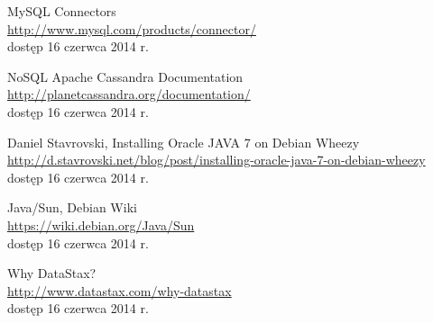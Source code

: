 \documentclass{article}
\begin{document}
\begin{thebibliography}{Xxx99x}

MySQL Connectors\\
\url{http://www.mysql.com/products/connector/}\\
dostęp 16 czerwca 2014 r.

NoSQL Apache Cassandra Documentation\\
\url{http://planetcassandra.org/documentation/}\\
dostęp 16 czerwca 2014 r.

Daniel Stavrovski, Installing Oracle JAVA 7 on Debian Wheezy\\
\url{http://d.stavrovski.net/blog/post/installing-oracle-java-7-on-debian-wheezy}\\
dostęp 16 czerwca 2014 r.

Java/Sun, Debian Wiki\\
\url{https://wiki.debian.org/Java/Sun}\\
dostęp 16 czerwca 2014 r.

Why DataStax?\\
\url{http://www.datastax.com/why-datastax}\\
dostęp 16 czerwca 2014 r.

\end{thebibliography}
\end{document}
